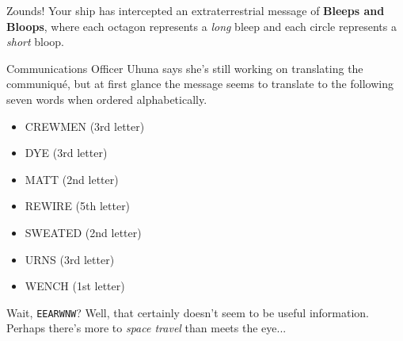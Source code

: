 Zounds! Your ship has intercepted an extraterrestrial message of
\textbf{Bleeps and Bloops}, where each octagon
represents a \textit{long} bleep and each circle represents
a \textit{short} bloop.

Communications Officer Uhuna says she's still working
on translating the communiqu\'e, but at first glance the message
seems to translate to the following seven words when ordered
alphabetically.

\begin{itemize}
\item CREWMEN (3rd letter)
\item DYE (3rd letter)
\item MATT (2nd letter)
\item REWIRE (5th letter)
\item SWEATED (2nd letter)
\item URNS (3rd letter)
\item WENCH (1st letter)
\end{itemize}

Wait, \texttt{EEARWNW}?
Well, that certainly doesn't seem to be useful information.
Perhaps there's more to \textit{space travel} than meets the eye... 
